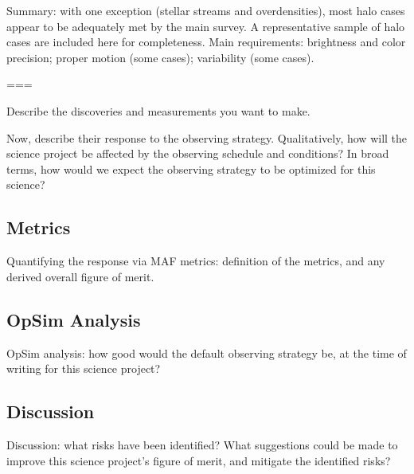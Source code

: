 Summary: with one exception (stellar streams and overdensities), most
halo cases appear to be adequately met by the main survey. A
representative sample of halo cases are included here for
completeness. Main requirements: brightness and color precision;
proper motion (some cases); variability (some cases).


===

Describe the discoveries and measurements you want to make.

Now, describe their response to the observing strategy. Qualitatively,
how will the science project be affected by the observing schedule and
conditions? In broad terms, how would we expect the observing strategy
to be optimized for this science?



\subsection{Metrics}
\label{sec:keyword:metrics}

Quantifying the response via MAF metrics: definition of the metrics,
and any derived overall figure of merit.


\subsection{OpSim Analysis}
\label{sec:keyword:analysis}

OpSim analysis: how good would the default observing strategy be, at
the time of writing for this science project?



\subsection{Discussion}
\label{sec:keyword:discussion}

Discussion: what risks have been identified? What suggestions could be
made to improve this science project's figure of merit, and mitigate
the identified risks?



\navigationbar
